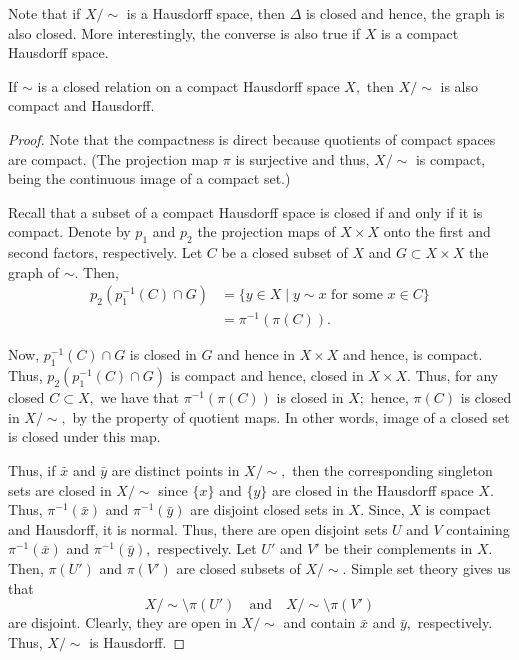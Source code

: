 \documentclass[12pt]{article}
\begin{document}
Note that if $X/{\sim}$ is a Hausdorff space, then $\Delta$ is closed and hence, the graph is also closed. More interestingly, the converse is also true if $X$ is a compact Hausdorff space.

\begin{prop} \label{prop:closedrelationhaus}
	If $\sim$ is a closed relation on a compact Hausdorff space $X,$ then $X/{\sim}$ is also compact and Hausdorff.
\end{prop}
\begin{proof} 
	Note that the compactness is direct because quotients of compact spaces are compact. (The projection map $\pi$ is surjective and thus, $X/{\sim}$ is compact, being the continuous image of a compact set.)

	Recall that a subset of a compact Hausdorff space is closed if and only if it is compact. Denote by $p_1$ and $p_2$ the projection maps of $X \times X$ onto the first and second factors, respectively. Let $C$ be a closed subset of $X$ and $G \subset X \times X$ the graph of $\sim.$ Then,
	\begin{align*} 
		p_2(p_1^{-1}(C) \cap G) &= \{y \in X \mid y \sim x \text{ for some } x \in C \}\\
		&= \pi^{-1}(\pi(C)).
	\end{align*}

	Now, $p_1^{-1}(C) \cap G$ is closed in $G$ and hence in $X \times X$ and hence, is compact. Thus, $p_2(p_1^{-1}(C) \cap G)$ is compact and hence, closed in $X \times X.$ Thus, for any closed $C \subset X,$ we have that $\pi^{-1}(\pi(C))$ is closed in $X;$ hence, $\pi(C)$ is closed in $X/{\sim},$ by the property of quotient maps. In other words, image of a closed set is closed under this map. 

	Thus, if $\bar{x}$ and $\bar{y}$ are distinct points in $X/{\sim},$ then the corresponding singleton sets are closed in $X/{\sim}$ since $\{x\}$ and $\{y\}$ are closed in the Hausdorff space $X.$ Thus, $\pi^{-1}(\bar{x})$ and $\pi^{-1}(\bar{y})$ are disjoint closed sets in $X.$ Since, $X$ is compact and Hausdorff, it is normal. Thus, there are open disjoint sets $U$ and $V$ containing $\pi^{-1}(\bar{x})$ and $\pi^{-1}(\bar{y}),$ respectively. Let $U'$ and $V'$ be their complements in $X.$ Then, $\pi(U')$ and $\pi(V')$ are closed subsets of $X/{\sim}.$ Simple set theory gives us that
	\begin{equation*} 
		X/{\sim}\setminus\pi(U') \quad\text{and}\quad X/{\sim}\setminus\pi(V')
	\end{equation*}
	are disjoint. Clearly, they are open in $X/{\sim}$ and contain $\bar{x}$ and $\bar{y},$ respectively. Thus, $X/{\sim}$ is Hausdorff.
\end{proof}
\end{document}
